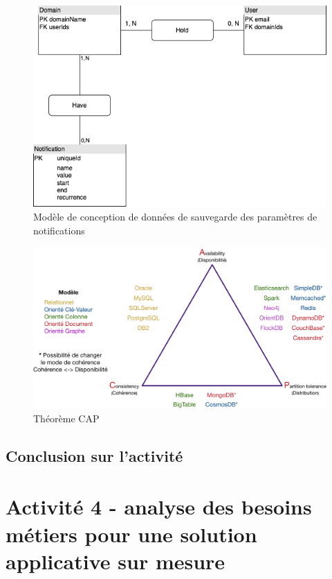 \documentclass[a4paper, 11pt]{report}
\begin{document}
  \begin{figure}[h]
      \centering
      \includegraphics[scale=0.40,center]{schemas/notifications-mcd-calhoun.png}
      \caption{Modèle de conception de données de sauvegarde des paramètres de notifications}
  \end{figure}
  \begin{figure}[h]
      \centering
      \includegraphics[scale=0.25,center]{schemas/cap-theoreme.png}
      \caption{Théorème CAP}
  \end{figure}
\subsection{Conclusion sur l'activité}

\section{Activité 4 - analyse des besoins métiers pour une solution applicative sur mesure}
\end{document}

